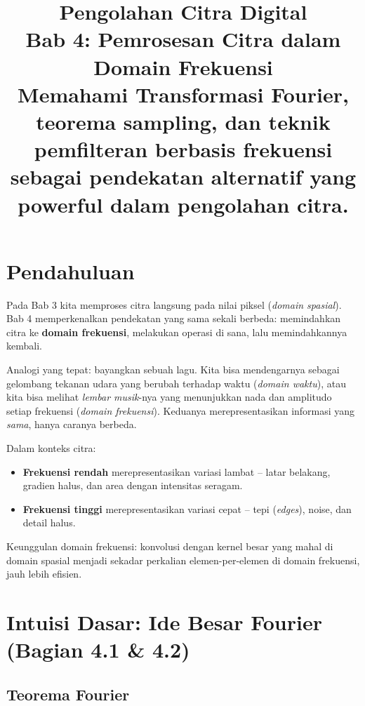 \documentclass[12pt,a4paper]{article}
\title{
  {\LARGE\bfseries Pengolahan Citra Digital}\\[0.5em]
  {\large Bab 4: Pemrosesan Citra dalam Domain Frekuensi}\\[0.8em]
  {\normalsize Memahami Transformasi Fourier, teorema sampling, dan teknik pemfilteran
   berbasis frekuensi sebagai pendekatan alternatif yang powerful dalam pengolahan citra.}
}
\author{}
\date{}
\begin{document}
\maketitle
\thispagestyle{fancy}
\tableofcontents
\newpage

\section{Pendahuluan}

Pada Bab 3 kita memproses citra langsung pada nilai piksel (\textit{domain spasial}).
Bab 4 memperkenalkan pendekatan yang sama sekali berbeda: memindahkan citra ke
\textbf{domain frekuensi}, melakukan operasi di sana, lalu memindahkannya kembali.

Analogi yang tepat: bayangkan sebuah lagu. Kita bisa mendengarnya sebagai gelombang
tekanan udara yang berubah terhadap waktu (\textit{domain waktu}), atau kita bisa melihat
\textit{lembar musik}-nya yang menunjukkan nada dan amplitudo setiap frekuensi
(\textit{domain frekuensi}). Keduanya merepresentasikan informasi yang \textit{sama},
hanya caranya berbeda.

Dalam konteks citra:
\begin{itemize}
  \item \textbf{Frekuensi rendah} merepresentasikan variasi lambat -- latar belakang,
        gradien halus, dan area dengan intensitas seragam.
  \item \textbf{Frekuensi tinggi} merepresentasikan variasi cepat -- tepi (\textit{edges}),
        noise, dan detail halus.
\end{itemize}

Keunggulan domain frekuensi: konvolusi dengan kernel besar yang mahal di domain spasial
menjadi sekadar perkalian elemen-per-elemen di domain frekuensi, jauh lebih efisien.

\section{Intuisi Dasar: Ide Besar Fourier (Bagian 4.1 \& 4.2)}

\subsection{Teorema Fourier}
\end{document}
